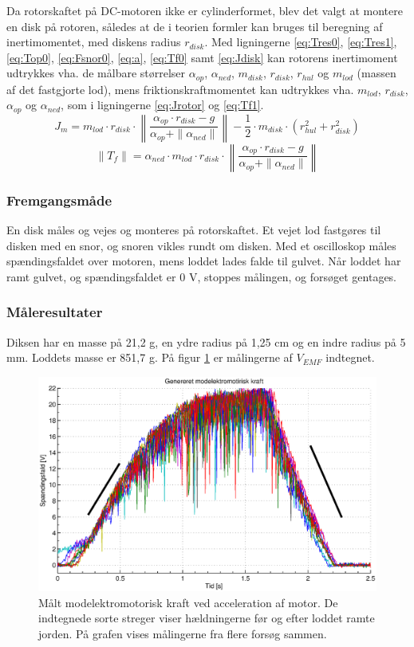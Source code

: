 Da rotorskaftet på DC-motoren ikke er cylinderformet, blev det valgt at montere en disk
på rotoren, således at de i teorien formler kan bruges til beregning af inertimomentet,
med diskens radius $r_{disk}$.
Med ligningerne \ref{eq:Tres0}, \ref{eq:Tres1}, \ref{eq:Top0}, \ref{eq:Fsnor0}, \ref{eq:a}, \ref{eq:Tf0} samt \ref{eq:Jdisk}
kan rotorens inertimoment udtrykkes vha. de målbare størrelser
$\alpha_{op}$, $\alpha_{ned}$, $m_{disk}$, $r_{disk}$, $r_{hul}$ og $m_{lod}$ (massen af det fastgjorte lod),
mens friktionskraftmomentet kan udtrykkes vha. $m_{lod}$, $r_{disk}$, $\alpha_{op}$ og $\alpha_{ned}$,
som i ligningerne \ref{eq:Jrotor} og \ref{eq:Tf1}.
\begin{equation}
	J_{m}=	m_{lod}\cdot{r_{disk}}\cdot\left\|\frac{\alpha_{op}\cdot{r_{disk}}-g}{\alpha_{op}+\|\alpha_{ned}\|}\right\|
			-\frac{1}{2}\cdot{m_{disk}}\cdot\left(r_{hul}^2+r_{disk}^2\right)
	\label{eq:Jrotor}
\end{equation}
\begin{equation}
	\|T_f\|= \alpha_{ned}\cdot{m_{lod}}\cdot{r_{disk}}\cdot\left\|\frac{\alpha_{op}\cdot{r_{disk}}-g}{\alpha_{op}+\|\alpha_{ned}\|}\right\|
	\label{eq:Tf1}
 \end{equation}
\subsubsection{Fremgangsmåde}
En disk måles og vejes og monteres på rotorskaftet.
Et vejet lod fastgøres til disken med en snor, og snoren vikles rundt om disken.
Med et oscilloskop måles spændingsfaldet over motoren, mens loddet lades falde til gulvet.
Når loddet har ramt gulvet, og spændingsfaldet er 0 V, stoppes målingen, og forsøget gentages.
\subsubsection{Måleresultater}
Diksen har en masse på 21,2 g, en ydre radius på 1,25 cm og en indre radius på 5 mm.
Loddets masse er 851,7 g.
På figur \ref{fig:vemf0} er målingerne af $V_{EMF}$ indtegnet.
\begin{figure}[th!]
	\centering
	\includegraphics[width=1\textwidth]{./graphics/vemf0.eps}
	\caption[Målt modelektromotorisk kraft ved acceleration af motor]
		{Målt modelektromotorisk kraft ved acceleration af motor.
		De indtegnede sorte streger viser hældningerne før og efter loddet ramte jorden.
		På grafen vises målingerne fra flere forsøg sammen.}
	\label{fig:vemf0}
\end{figure}
